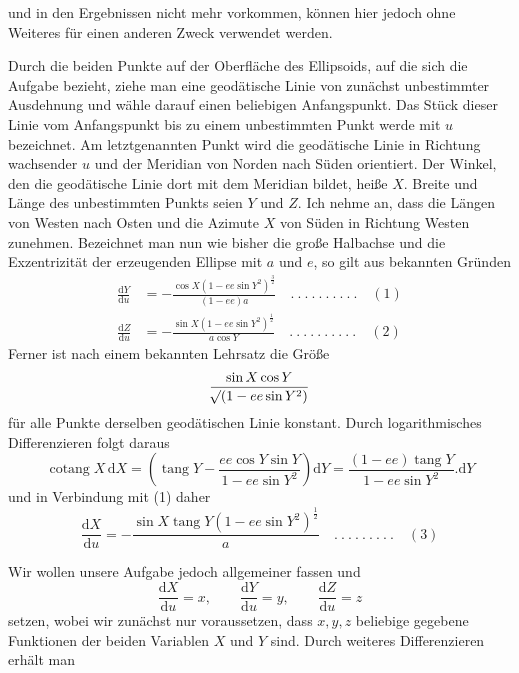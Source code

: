 %
und in den Ergebnissen nicht mehr vorkommen, können hier jedoch ohne Weiteres für einen anderen Zweck verwendet werden.

Durch die beiden Punkte auf der Oberfläche des Ellipsoids, auf die sich die Aufgabe bezieht, ziehe man eine geodätische Linie von zunächst unbestimmter Ausdehnung und wähle darauf einen beliebigen Anfangspunkt. Das Stück dieser Linie vom Anfangspunkt bis zu einem unbestimmten Punkt werde mit \(u\) bezeichnet. Am letztgenannten Punkt wird die geodätische Linie in Richtung wachsender \(u\) und der Meridian von Norden nach Süden orientiert. Der Winkel, den die geodätische Linie dort mit dem Meridian bildet, heiße \(X\). Breite und Länge des unbestimmten Punkts seien \(Y\) und \(Z\). Ich nehme an, dass die Längen von Westen nach Osten und die Azimute \(X\) von Süden in Richtung Westen zunehmen. Bezeichnet man nun wie bisher die große Halbachse und die Exzentrizität der erzeugenden Ellipse mit \(a\) und \(e\), so gilt aus bekannten Gründen
\[
\begin{aligned}
\frac{\mathrm{d}Y}{\mathrm{d}u}&=-\frac{\cos X(1-ee\sin Y^2)^{\frac32}}{(1-ee)a}\quad .\ .\ .\ .\ .\ .\ .\ .\ .\ .\quad(1)\\
\frac{\mathrm{d}Z}{\mathrm{d}u}&=-\frac{\sin X(1-ee\sin Y^2)^{\frac12}}{a\cos Y}\quad .\ .\ .\ .\ .\ .\ .\ .\ .\ .\quad(2)
\end{aligned}
\]
Ferner ist nach einem bekannten Lehrsatz die Größe
\[
\frac{\sin X\cos Y}{\mathord{{}^{}\!\surd}(1-ee\sin Y^2)}
\]
für alle Punkte derselben geodätischen Linie konstant. Durch logarithmisches Differenzieren folgt daraus
\[
\operatorname{cotang}X\,\mathrm{d}X=(\operatorname{tang}Y-\frac{ee\cos Y\sin Y}{1-ee\sin Y^2})\mathrm{d}Y=\frac{(1-ee)\operatorname{tang}Y}{1-ee\sin Y^2}\mathord{.}\mathrm{d}Y
\]
und in Verbindung mit (1) daher
\[
\frac{\mathrm{d}X}{\mathrm{d}u}=-\frac{\sin X\operatorname{tang}Y(1-ee\sin Y^2)^{\frac12}}{a}\quad .\ .\ .\ .\ .\ .\ .\ .\ .\quad(3)
\]

\indent Wir wollen unsere Aufgabe jedoch allgemeiner fassen und
\[
\frac{\mathrm{d}X}{\mathrm{d}u}=x,\qquad\frac{\mathrm{d}Y}{\mathrm{d}u}=y,\qquad\frac{\mathrm{d}Z}{\mathrm{d}u}=z
\]
setzen, wobei wir zunächst nur voraussetzen, dass \(x,y,z\) beliebige gegebene Funktionen der beiden Variablen \(X\) und \(Y\) sind. Durch weiteres Differenzieren erhält man

